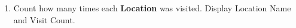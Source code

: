 \documentclass[12pt,a4paper]{article}
\begin{document}
\begin{enumerate}





    \item Count how many times each \textbf{Location} was visited. Display Location Name and Visit Count.



\end{enumerate}
\end{document}
